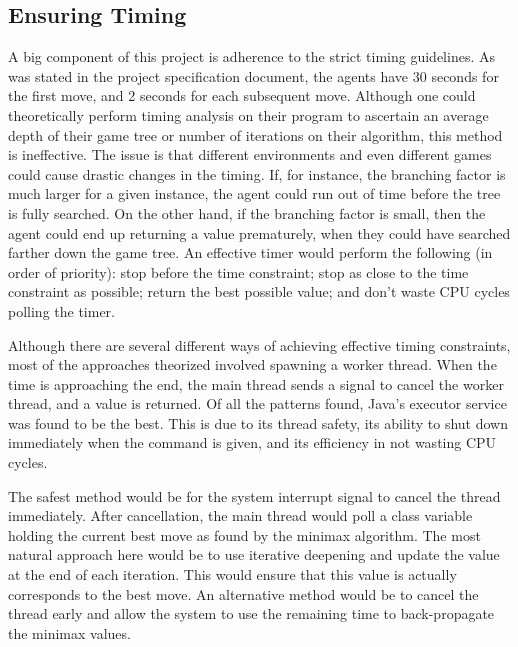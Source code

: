 \documentclass[]{article}
\begin{document}
\subsection{Ensuring Timing}
A big component of this project is adherence to the strict timing guidelines. As was stated in the project specification document, the agents have 30 seconds for the first move, and 2 seconds for each subsequent move. Although one could theoretically perform timing analysis on their program to ascertain an average depth of their game tree or number of iterations on their algorithm, this method is ineffective. The issue is that different environments and even different games could cause drastic changes in the timing. If, for instance, the branching factor is much larger for a given instance, the agent could run out of time before the tree is fully searched. On the other hand, if the branching factor is small, then the agent could end up returning a value prematurely, when they could have searched farther down the game tree. An effective timer would perform the following (in order of priority): stop before the time constraint; stop as close to the time constraint as possible; return the best possible value; and don't waste CPU cycles polling the timer.

Although there are several different ways of achieving effective timing constraints, most of the approaches theorized involved spawning a worker thread. When the time is approaching the end, the main thread sends a signal to cancel the worker thread, and a value is returned. Of all the patterns found, Java's executor service was found to be the best. This is due to its thread safety, its ability to shut down immediately when the command is given, and its efficiency in not wasting CPU cycles. 

The safest method would be for the system interrupt signal to cancel the thread immediately. After cancellation, the main thread would poll a class variable holding the current best move as found by the minimax algorithm. The most natural approach here would be to use iterative deepening and update the value at the end of each iteration. This would ensure that this value is actually corresponds to the best move. An alternative method would be to cancel the thread early and allow the system to use the remaining time to back-propagate the minimax values. 
\end{document}
